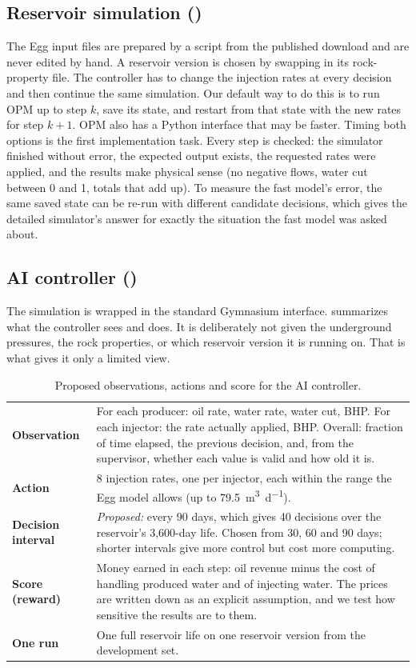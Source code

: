 \documentclass[11pt,letterpaper]{article}
\begin{document}
\subsection{Reservoir simulation (\AzizS)}

The Egg input files are prepared by a script from the published download and are never
edited by hand. A reservoir version is chosen by swapping in its rock-property file. The
controller has to change the injection rates at every decision and then continue the same
simulation. Our default way to do this is to run OPM up to step $k$, save its state, and
restart from that state with the new rates for step $k+1$. OPM also has a Python interface
that may be faster. Timing both options is the first implementation task. Every step is
checked: the simulator finished without error, the expected output exists, the requested
rates were applied, and the results make physical sense (no negative flows, water cut
between 0 and 1, totals that add up). To measure the fast model's error, the same saved
state can be re-run with different candidate decisions, which gives the detailed
simulator's answer for exactly the situation the fast model was asked about.

\subsection{AI controller (\AbduS)}

The simulation is wrapped in the standard Gymnasium interface.  summarizes
what the controller sees and does. It is deliberately not given the underground pressures,
the rock properties, or which reservoir version it is running on. That is what gives it
only a limited view.

\begin{table}[!htbp]
\caption{Proposed observations, actions and score for the AI controller.}\label{tab:obs}
\small
\begin{tabularx}{\textwidth}{@{}P{2.4cm}L@{}}
\toprule
\textbf{Observation} & For each producer: oil rate, water rate, water cut, BHP. For each injector: the rate actually applied, BHP. Overall: fraction of time elapsed, the previous decision, and, from the supervisor, whether each value is valid and how old it is. \\
\textbf{Action} & 8 injection rates, one per injector, each within the range the Egg model allows (up to \SI{79.5}{\cubic\metre\per\day}). \\
\textbf{Decision interval} & \emph{Proposed:} every 90 days, which gives 40 decisions over the reservoir's 3,600-day life. Chosen from 30, 60 and 90 days; shorter intervals give more control but cost more computing. \\
\textbf{Score (reward)} & Money earned in each step: oil revenue minus the cost of handling produced water and of injecting water. The prices are written down as an explicit assumption, and we test how sensitive the results are to them. \\
\textbf{One run} & One full reservoir life on one reservoir version from the development set. \\
\bottomrule
\end{tabularx}
\end{table}
\end{document}
